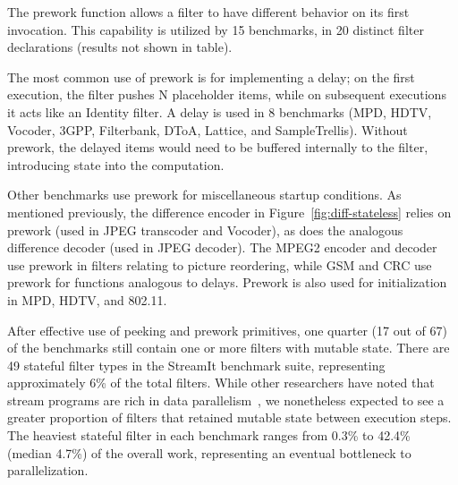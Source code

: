   The prework
function allows a filter to have different behavior on its first
invocation.  This capability is utilized by 15 benchmarks, in 20
distinct filter declarations (results not shown in table).

The most common use of prework is for implementing a delay; on the
first execution, the filter pushes N placeholder items, while on
subsequent executions it acts like an Identity filter.  A delay is
used in 8 benchmarks (MPD, HDTV, Vocoder, 3GPP, Filterbank, DToA,
Lattice, and SampleTrellis).  Without prework, the delayed items would
need to be buffered internally to the filter, introducing state into
the computation.

Other benchmarks use prework for miscellaneous startup conditions.  As
mentioned previously, the difference encoder in
Figure~\ref{fig:diff-stateless} relies on prework (used in JPEG
transcoder and Vocoder), as does the analogous difference decoder
(used in JPEG decoder).  The MPEG2 encoder and decoder use prework in
filters relating to picture reordering, while GSM and CRC use prework
for functions analogous to delays.  Prework is also used for
initialization in MPD, HDTV, and 802.11.

\newpage
{}  After effective use
of peeking and prework primitives, one quarter (17 out of 67) of the
benchmarks still contain one or more filters with mutable state.
There are 49 stateful filter types in the StreamIt benchmark suite,
representing approximately 6\% of the total filters.  While other
researchers have noted that stream programs are rich in data
parallelism~\cite{imagine03ieee}, we nonetheless expected to see a
greater proportion of filters that retained mutable state between
execution steps.  The heaviest stateful filter in each benchmark
ranges from 0.3\% to 42.4\% (median 4.7\%) of the overall work,
representing an eventual bottleneck to parallelization.


